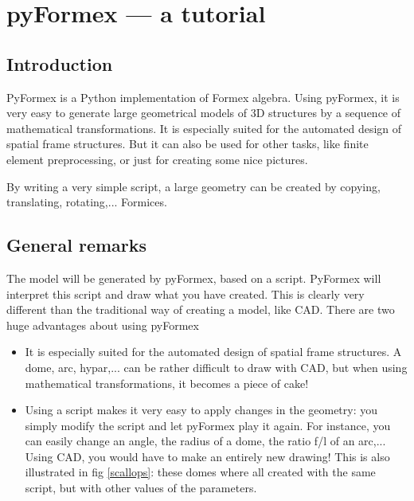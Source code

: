 \documentclass[a4paper]{manual}
\begin{document}
\chapter{pyFormex --- a tutorial}
{\label{cha:tutorial}

\section{Introduction}

PyFormex is a Python implementation of Formex algebra. Using pyFormex, it is very easy to  generate large geometrical models of 3D structures by a sequence of mathematical transformations. It is especially suited for the automated design of spatial frame structures. But it can also be used for other tasks, like finite element preprocessing, or just for creating some nice pictures.

By writing a very simple script, a large geometry can be created by copying, translating, rotating,... Formices.  

\section{General remarks}

The model will be generated by pyFormex, based on a script. PyFormex will interpret this script and draw what you have created. This is clearly very different than the traditional way of creating a model, like CAD. There are two huge advantages about using pyFormex

\begin{itemize}
\item It is especially suited for the automated design of spatial frame structures. A dome, arc, hypar,... can be rather difficult to draw with CAD, but when using mathematical transformations, it becomes a piece of cake!
\item Using a script makes it very easy to apply changes in the geometry: you simply modify the script and let pyFormex play it again. For instance, you can easily change an angle, the radius of a dome, the ratio f/l of an arc,... Using CAD, you would have to make an entirely new drawing! This is also illustrated in fig \ref{scallops}: these domes where all created with the same script, but with other values of the parameters.
\end{itemize}

}
\end{document}
